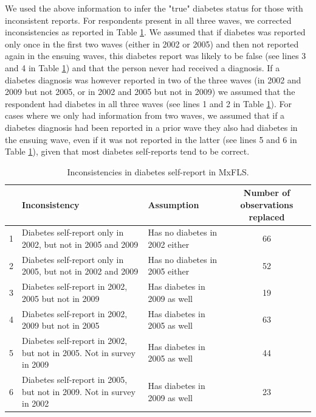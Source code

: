 \documentclass[12pt,english]{article}
\providecommand{\tabularnewline}{\\}
\begin{document}
\begin{appendix}
We used the above information to infer the "true" diabetes status for those with inconsistent reports. For respondents present in all three waves, we corrected inconsistencies as reported in Table \ref{tab:Inconsistencies}. We assumed that if diabetes was reported only once in the first two waves (either in 2002 or 2005) and then not reported again in the ensuing waves, this diabetes report was likely to be false (see lines 3 and 4 in Table \ref{tab:Inconsistencies}) and that the person never had received a diagnosis. If a diabetes diagnosis was however reported in two of the three waves (in 2002 and 2009 but not 2005, or in 2002 and 2005 but not in 2009) we assumed that the respondent had diabetes in all three waves (see lines 1 and 2 in Table \ref{tab:Inconsistencies}). For cases where we only had information from two waves, we assumed that if a diabetes diagnosis had been reported in a prior wave they also had diabetes in the ensuing wave, even if it was not reported in the latter (see lines 5 and 6 in Table \ref{tab:Inconsistencies}), given that most diabetes self-reports tend to be correct.


\begin{table}[h!]
\caption{\label{tab:Inconsistencies}Inconsistencies in diabetes self-report in MxFLS.}
\begin{center}
\begin{adjustbox}{max width=\linewidth} 
\begin{tabular}{lllc}
\hline 
 &Inconsistency  & Assumption  & Number of observations replaced\tabularnewline
\hline 
1 &Diabetes self-report only in 2002, but not in 2005 and 2009  & Has no diabetes in 2002 either  & 66\tabularnewline
2 &Diabetes self-report only in 2005, but not in 2002 and 2009  & Has no diabetes in 2005 either  & 52\tabularnewline
3 &Diabetes self-report in 2002, 2005 but not in 2009  & Has diabetes in 2009 as well  & 19\tabularnewline
4 &Diabetes self-report in 2002, 2009 but not in 2005  & Has diabetes in 2005 as well  & 63\tabularnewline
5 &Diabetes self-report in 2002, but not in 2005. Not in survey in 2009  & Has diabetes in 2005 as well  & 44\tabularnewline
6 &Diabetes self-report in 2005, but not in 2009. Not in survey in 2002  & Has diabetes in 2009 as well  & 23\tabularnewline
\end{tabular}
\end{adjustbox}
\end{center}
\end{table}


\end{appendix}
\end{document}
